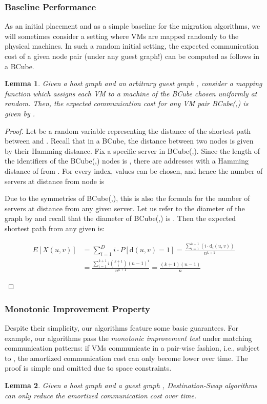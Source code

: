 \documentclass[conference]{IEEEtran}
\newtheorem{lemma}{Lemma}
\newtheorem{proof}{Proof}
\newcommand{\dist}{\text{d}}
\def\BC#1#2{BCube(#1,#2)}
\begin{document}
\subsubsection{Baseline Performance}

As an initial placement and as a simple baseline for the migration algorithms, we
will sometimes consider a setting where VMs are mapped randomly to the physical machines.
In such a random initial setting, the expected communication cost of a given node pair (under any guest graph!) can
be computed as follows in a BCube.
\begin{lemma}\label{lemma:No-Algo}
Given a host graph  and an arbitrary guest graph , consider a mapping function  which assigns each VM to a machine of the BCube chosen uniformly at random.
Then, the expected communication cost for any VM pair \BC{}{} is given by
.
\end{lemma}
\begin{proof}
Let  be a random variable representing the distance of the shortest path between  and .
Recall that in a BCube, the distance between two nodes is given by their Hamming distance.
Fix a specific server  in \BC{}{}. Since the length of the identifiers of the \BC{}{} nodes is ,
there are 
addresses with a Hamming distance of  from .
For every index,  values can be chosen, and hence the number of servers at distance  from node  is

Due to the symmetries of \BC{}{}, this is also the formula for the number of servers at distance  from any given server.
Let us refer to the diameter of the graph by  and recall that
 the diameter of \BC{}{} is . Then the expected shortest path from any given  is:

 \begin{footnotesize}
\begin {align*}
 E[X(u,v)] &= \sum\limits_{i=1}^{D} i\cdot P[\dist(u,v) = 1]
= \frac{\sum\limits_{i=1}^{k+1} (i\cdot\dist_i(u,v))}{n^{k+1}} \\
&= \frac{\sum_{i=1}^{k+1} i{k+1\choose i}(n-1)^i}{n^{k+1}}
= \frac{(k+1)(n-1)}{n}
\end {align*}
 \end{footnotesize}
\end{proof}

\subsubsection{Monotonic Improvement Property}

Despite their simplicity, our algorithms feature some basic guarantees.
For example, our algorithms pass the \emph{monotonic improvement test} under
matching communication patterns: if VMs communicate in a pair-wise fashion,
i.e., subject to , the amortized communication cost can only become lower over time.
The proof is simple and omitted due to space constraints.
\begin{lemma}\label{lemma:Matching}
Given a host graph  and a guest graph ,
\emph{Destination-Swap}
algorithms can only reduce the amortized communication cost over time.
\end{lemma}
\end{document}
